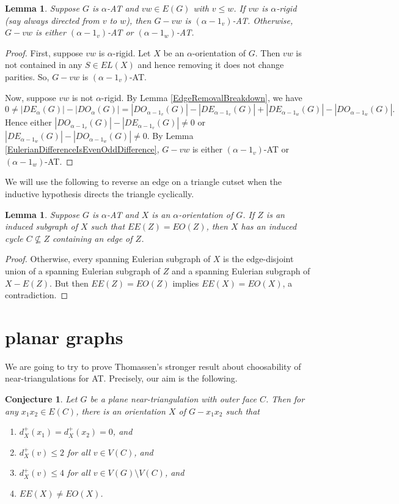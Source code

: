\documentclass[12pt]{article}
\theoremstyle{plain}
\newtheorem{lem}[thm]{Lemma}
\newtheorem{conjecture}[thm]{Conjecture}
\theoremstyle{definition}
\theoremstyle{remark}
\begin{document}
\begin{lem}\label{EdgeRemoval}
	Suppose $G$ is $\alpha$-AT and $vw \in E(G)$ with $v \le w$.  If $vw$ is $\alpha$-rigid (say always directed from $v$ to $w$), then $G-vw$ is $(\alpha - 1_v)$-AT.  Otherwise, $G-vw$ is either $(\alpha - 1_v)$-AT or $(\alpha - 1_w)$-AT.
\end{lem}
\begin{proof}
	First, suppose $vw$ is $\alpha$-rigid.  Let $X$ be an $\alpha$-orientation of $G$.  Then $vw$ is not contained in any $S \in EL(X)$ and hence removing it does not change parities. So, $G-vw$ is $(\alpha - 1_v)$-AT.
	
	Now, suppose $vw$ is not $\alpha$-rigid.  By Lemma \ref{EdgeRemovalBreakdown}, we have
	\[0 \ne |DE_\alpha(G)| - |DO_\alpha(G)| = |DO_{\alpha - 1_v}(G)| - |DE_{\alpha - 1_v}(G)| + |DE_{\alpha - 1_w}(G)| - |DO_{\alpha - 1_w}(G)|.\]
	Hence either $|DO_{\alpha - 1_v}(G)| - |DE_{\alpha - 1_v}(G)| \ne 0$ or $|DE_{\alpha - 1_w}(G)| - |DO_{\alpha - 1_w}(G)| \ne 0$.  By Lemma \ref{EulerianDifferenceIsEvenOddDifference}, $G-vw$ is either $(\alpha - 1_v)$-AT or $(\alpha - 1_w)$-AT.
\end{proof}


We will use the following to reverse an edge on a triangle cutset when the inductive hypothesis directs the triangle cyclically.
\begin{lem}\label{AtLeastTwoCycles}
	Suppose $G$ is $\alpha$-AT and $X$ is an $\alpha$-orientation of $G$.  If $Z$ is an induced subgraph of $X$ such that $EE(Z) = EO(Z)$, then $X$ has an induced cycle $C \not \subseteq Z$ containing an edge of $Z$.
\end{lem}
\begin{proof}
	Otherwise, every spanning Eulerian subgraph of $X$ is the edge-disjoint union of a spanning Eulerian subgraph of $Z$ and a spanning Eulerian subgraph of $X - E(Z)$.  But then $EE(Z) = EO(Z)$ implies $EE(X) = EO(X)$, a contradiction.
\end{proof}

\section{planar graphs}
We are going to try to prove Thomassen's stronger result about choosability of near-triangulations for AT.  Precisely, our aim is the following.

\begin{conjecture}
  Let $G$ be a plane near-triangulation with outer face $C$.  Then for any $x_1x_2 \in E(C)$, there is an orientation $X$ of $G-x_1x_2$ such that
  \begin{enumerate}
  	\item $d_X^+(x_1) = d_X^+(x_2) = 0$, and
  	\item $d_X^+(v) \le 2$ for all $v \in V(C)$, and
  	\item $d_X^+(v) \le 4$ for all $v \in V(G) \setminus V(C)$, and
  	\item $EE(X) \ne EO(X)$.
  \end{enumerate}
\end{conjecture}
\end{document}
